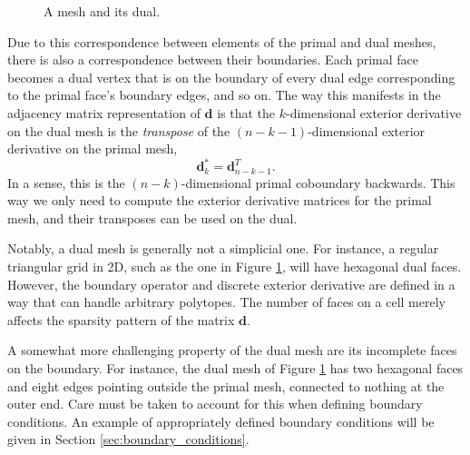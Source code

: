 \documentclass[utf8,english]{gradu3}
\begin{document}
\begin{figure}[h]
  \centering
  \caption{A mesh and its dual.}
  \label{fig:dual_mesh}
\end{figure}

Due to this correspondence between elements of the primal and dual meshes,
there is also a correspondence between their boundaries.
Each primal face becomes a dual vertex that is on the boundary
of every dual edge corresponding to the primal face's boundary edges, and so on.
The way this manifests in the adjacency matrix representation of $\mathbf{d}$
is that the $k$-dimensional exterior derivative
on the dual mesh is the \textit{transpose} of the $(n-k-1)$-dimensional
exterior derivative on the primal mesh,
\[
  \mathbf{d}^*_k = \mathbf{d}_{n-k-1}^T.
\]
In a sense, this is the $(n-k)$-dimensional primal coboundary backwards.
This way we only need to compute the exterior derivative matrices
for the primal mesh, and their transposes can be used on the dual.

Notably, a dual mesh is generally not a simplicial one.
For instance, a regular triangular grid in 2D,
such as the one in Figure \ref{fig:dual_mesh}, will have hexagonal dual faces.
However, the boundary operator and discrete exterior derivative
are defined in a way that can handle arbitrary polytopes.
The number of faces on a cell merely affects the sparsity pattern
of the matrix $\mathbf{d}$.

A somewhat more challenging property of the dual mesh
are its incomplete faces on the boundary.
For instance, the dual mesh of Figure \ref{fig:dual_mesh} has two hexagonal faces
and eight edges pointing outside the primal mesh, connected to nothing at the outer end.
Care must be taken to account for this when defining boundary conditions.
An example of appropriately defined boundary conditions
will be given in Section \ref{sec:boundary_conditions}.
\end{document}

